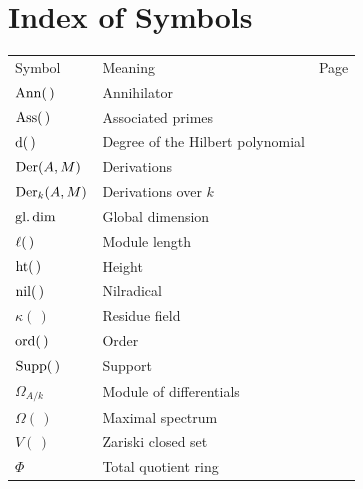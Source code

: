 \documentclass[twoside]{book}
\begin{document}





\pagestyle{plain}




%

\tableofcontents

\pagestyle{fancy}




\pagestyle{plain}

\renewcommand*{\bibfont}{\small}
\printbibliography[
heading=bibintoc,
title={bibliography}
]
{\footnotesize
\printindex\label{index}
}
\chapter*{Index of Symbols}
\label{index:symbols}
\begin{center}
\begin{tabular}{llr}
Symbol & Meaning & Page\\[0.5em]
$\operatorname{Ann}(\,)$ & Annihilator & \pageref{lem:01.01}\\
$\operatorname{Ass}(\,)$ & Associated primes & \pageref{7.A}\\
$\mathrm{d}(\,)$ & Degree of the Hilbert polynomial & \pageref{sym:hilbertd}\\
$\operatorname{Der}(A,M)$ & Derivations & \pageref{26.A}\\
$\operatorname{Der}_k(A,M)$ & Derivations over $k$ & \pageref{sym:Derk}\\
$\operatorname{gl. dim}$ & Global dimension & \pageref{sym:gldim}\\
$\ell(\,)$ & Module length & \pageref{10.E}\\
$\operatorname{ht}(\,)$ & Height & \pageref{12.A}\\
$\operatorname{nil}(\,)$ & Nilradical & \pageref{sym:nil}\\
$\kappa(\,)$ & Residue field & \pageref{sym:kappa}\\
$\operatorname{ord}(\,)$ & Order & \pageref{17.C}\\
$\operatorname{Supp}(\,)$ & Support & \pageref{sym:Supp}\\
$\Omega_{A/k}$ & Module of differentials & \pageref{sym:differentials}\\
$\Omega(\,)$ & Maximal spectrum & \pageref{sym:maxspec}\\
$V(\,)$ & Zariski closed set & \pageref{sym:V}\\
$\Phi$ & Total quotient ring & \pageref{sym:Phi}
\end{tabular}
\end{center}

\end{document}
